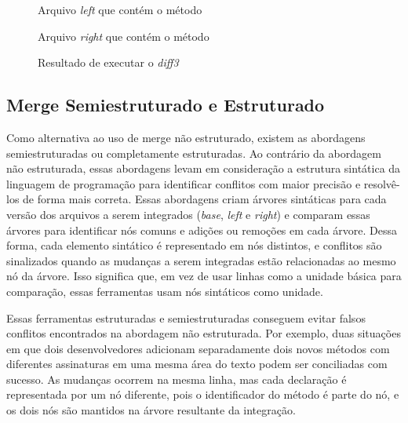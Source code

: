 \begin{figure}[ht]
	\begin{center}
		
		\caption{Arquivo \emph{left} que contém o método }\label{left_example}
	\end{center}
\end{figure}

\begin{figure}[ht]
	\begin{center}
		
		\caption{Arquivo \emph{right} que contém o método }\label{right_example}
	\end{center}
\end{figure}

\begin{figure}[ht]
	\begin{center}
		
	\end{center}
	\caption{Resultado de executar o \emph{diff3}}\label{diff3_example}
\end{figure}

\subsection{Merge Semiestruturado e Estruturado}
Como alternativa ao uso de merge não estruturado, existem as abordagens
semiestruturadas ou completamente estruturadas. Ao contrário da abordagem não
estruturada, essas abordagens levam em consideração a estrutura sintática da
linguagem de programação para identificar conflitos com maior precisão e resolvê-los de
forma mais correta. Essas abordagens criam árvores sintáticas para
cada versão dos arquivos a serem integrados (\emph{base}, \emph{left} e \emph{right})
e comparam essas árvores para identificar nós comuns
e adições ou remoções em cada árvore. Dessa forma, cada elemento sintático
é representado em nós distintos, e conflitos são sinalizados quando as mudanças
a serem integradas estão relacionadas ao mesmo nó da árvore. Isso significa
que, em vez de usar linhas como a unidade básica para comparação, essas ferramentas usam
nós sintáticos como unidade.

Essas ferramentas estruturadas e semiestruturadas conseguem evitar falsos conflitos
encontrados na abordagem não estruturada. Por exemplo, duas situações em
que dois desenvolvedores adicionam separadamente dois novos métodos com diferentes
assinaturas em uma mesma área do texto podem ser conciliadas com sucesso.
As mudanças ocorrem na mesma linha, mas cada declaração é representada por
um nó diferente, pois o identificador do método é parte do nó,
e os dois nós são mantidos na árvore resultante da integração.

